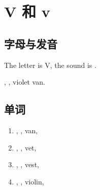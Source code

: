 
\section{V 和 v}

\subsection{字母与发音}

The letter is V, the sound is .

, , violet van.

\subsection{单词}

\begin{enumerate}
  \item {}, , van, 
  \item {}, , vet, 
  \item {}, , vest, 
  \item {}, , violin, 
\end{enumerate}

